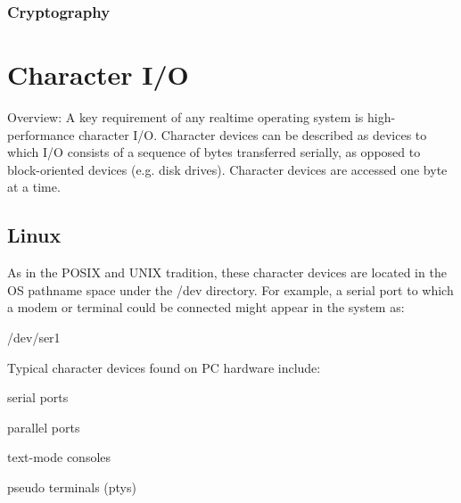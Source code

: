\documentclass[10pt,draftclsnofoot,onecolumn,journal,compsoc]{IEEEtran}
\newcommand{\tab}{\hspace*{2em}} %
\begin{document}
\subsubsection*{Cryptography}

\section*{Character I/O}
\tab Overview: A key requirement of any realtime operating system is high-performance character I/O. Character devices can be described as devices to which I/O consists of a sequence of bytes transferred serially, as opposed to block-oriented devices (e.g. disk drives). Character devices are accessed one byte at a time.

\subsection*{Linux}
\tab As in the POSIX and UNIX tradition, these character devices are located in the OS pathname space under the /dev directory. For example, a serial port to which a modem or terminal could be connected might appear in the system as:\par

/dev/ser1\par

Typical character devices found on PC hardware include:\par

serial ports

parallel ports

text-mode consoles

pseudo terminals (ptys)
\end{document}
